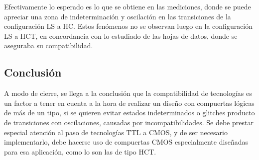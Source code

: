 Efectivamente lo esperado es lo que se obtiene en las mediciones, donde se puede apreciar una zona de indeterminación y oscilación en las transiciones de la configuración 
LS a HC.
Estos fenómenos no se observan luego en la configuración LS a HCT, en concordancia con lo estudiado de las hojas de datos, donde se aseguraba su compatibilidad.



\subsection{Conclusión}
A modo de cierre, se llega a la conclusión que la compatibilidad de tecnologías es un factor a tener en cuenta a la hora de realizar un diseño con compuertas lógicas de 
más de un tipo, si se quieren evitar estados indeterminados o glitches producto de transiciones con oscilaciones, causadas por incompatibilidades.
Se debe prestar especial atención al paso de tecnologías TTL a CMOS, y de ser necesario implementarlo, debe hacerse uso de compuertas CMOS especialmente diseñadas para 
esa aplicación, como lo son las de tipo HCT.
